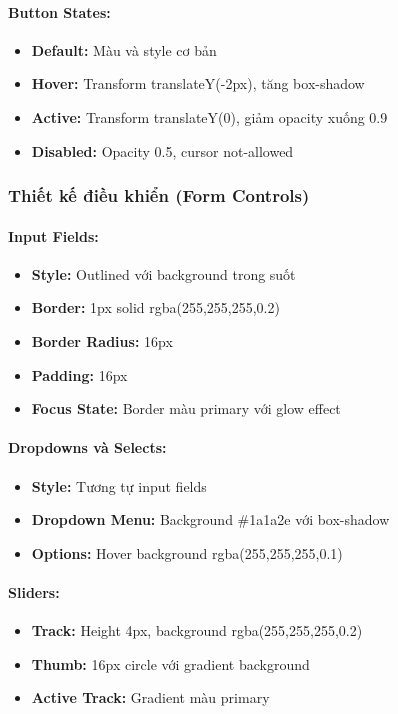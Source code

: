 \paragraph{Button States:}
\begin{itemize}
    \item \textbf{Default:} Màu và style cơ bản
    \item \textbf{Hover:} Transform translateY(-2px), tăng box-shadow
    \item \textbf{Active:} Transform translateY(0), giảm opacity xuống 0.9
    \item \textbf{Disabled:} Opacity 0.5, cursor not-allowed
\end{itemize}

\subsubsection{Thiết kế điều khiển (Form Controls)}

\paragraph{Input Fields:}
\begin{itemize}
    \item \textbf{Style:} Outlined với background trong suốt
    \item \textbf{Border:} 1px solid rgba(255,255,255,0.2)
    \item \textbf{Border Radius:} 16px
    \item \textbf{Padding:} 16px
    \item \textbf{Focus State:} Border màu primary với glow effect
\end{itemize}

\paragraph{Dropdowns và Selects:}
\begin{itemize}
    \item \textbf{Style:} Tương tự input fields
    \item \textbf{Dropdown Menu:} Background \#1a1a2e với box-shadow
    \item \textbf{Options:} Hover background rgba(255,255,255,0.1)
\end{itemize}

\paragraph{Sliders:}
\begin{itemize}
    \item \textbf{Track:} Height 4px, background rgba(255,255,255,0.2)
    \item \textbf{Thumb:} 16px circle với gradient background
    \item \textbf{Active Track:} Gradient màu primary
\end{itemize}

